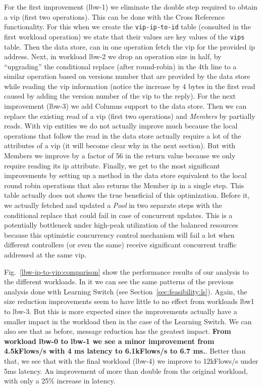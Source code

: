 \documentclass[12pt,openright,twoside]{report}
\begin{document}
For the first improvement (lbw-1) we eliminate the double step required to obtain a \gls{vip} (first two operations). 
This can be done with the Cross Reference functionality. For this when we create  the \texttt{vip-ip-to-id} table (consulted in the first workload operation)  we state that their values are key values of the \texttt{vips} table. Then the data store, can  in one operation  fetch the \gls{vip} for the provided \gls{ip} address. 
Next, in workload lbw-2 we drop an operation size in half, by ``upgrading'' the conditional replace (after round-robin) in the 4th line to a similar operation based on  versions number that are  provided by the data store while reading the \gls{vip} information (notice the increase by 4 bytes in the first read caused by adding the version number of the \gls{vip} to the reply).  
For the next improvement (lbw-3) we add Columns support to the data store. 
Then we can replace the existing read of a \gls{vip} (first two operations) and \emph{Members} by partially reads. 
With \gls{vip} entities we do not actually improve much because the local operations that follow the read in the
data store actually require a lot of the attributes of a \gls{vip} (it will become clear why in the next section). 
But with Members we improve by a factor of 56 in the return value because we only require reading its \gls{ip} attribute. 
Finally, we get to the most significant improvements by setting up a method in the data store equivalent to the local round robin operations that also returns the Member \gls{ip} in a single step.
This table actually does not shows the true beneficial of this optimization. 
Before it, we actually fetched and updated a \emph{Pool} in two separate steps with the conditional replace that could fail in case of concurrent updates. 
This is a potentially bottleneck under high-peak utilization of the balanced resources because this optimistic concurrency control mechanism will fail a lot when different controllers (or even the same) receive significant concurrent traffic addressed at the same \gls{vip}.  






Fig.~\ref{lbw-ip-to-vip:comparison} show the performance results of our analysis to the different workloads. 
In it  we can see the same patterns of the previous analysis done with Learning Switch (see Section~\ref{sec:feasibility:ls}).
Again, the size reduction improvements seem to have little to no effect from workloads lbw1 to lbw-3. 
But this is more expected since the improvements actually have a smaller impact in the workload then in the case of the Learning Switch. We can also see that as before, message reduction has the greatest impact. 
\textbf{From workload lbw-0 to lbw-1 we see a minor improvement from 4.5kFlows/s with 4 ms latency to 6.1kFlows/s to 6.7 ms.}. 
Better than that, we see that with the final workload (lbw-4) we improve to 12kFlows/s  under 5ms latency. 
An improvement of more than double from the original workload, with only a 25\% increase in latency. 
\end{document}
